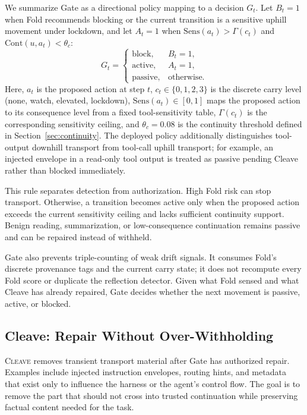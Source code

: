 We summarize Gate as a directional policy mapping to a decision $G_t$. Let $B_t=1$ when Fold recommends blocking or the current transition is a sensitive uphill movement under lockdown, and let $A_t=1$ when $\mathrm{Sens}(a_t)>\Gamma(c_t)$ and $\mathrm{Cont}(u,a_t)<\theta_c$:
\begin{equation}
G_t =
\begin{cases}
\mathrm{block}, & B_t=1,\\
\mathrm{active}, & A_t=1,\\
\mathrm{passive}, & \text{otherwise.}
\end{cases}
\end{equation}
Here, $a_t$ is the proposed action at step $t$, $c_t\in\{0,1,2,3\}$ is the discrete carry level (none, watch, elevated, lockdown), $\mathrm{Sens}(a_t)\in[0,1]$ maps the proposed action to its consequence level from a fixed tool-sensitivity table, $\Gamma(c_t)$ is the corresponding sensitivity ceiling, and $\theta_c=0.08$ is the continuity threshold defined in Section~\ref{sec:continuity}. The deployed policy additionally distinguishes tool-output downhill transport from tool-call uphill transport; for example, an injected envelope in a read-only tool output is treated as passive pending Cleave rather than blocked immediately.

This rule separates detection from authorization. High Fold risk can stop transport. Otherwise, a transition becomes active only when the proposed action exceeds the current sensitivity ceiling and lacks sufficient continuity support. Benign reading, summarization, or low-consequence continuation remains passive and can be repaired instead of withheld.

Gate also prevents triple-counting of weak drift signals. It consumes Fold's discrete provenance tags and the current carry state; it does not recompute every Fold score or duplicate the reflection detector. Given what Fold sensed and what Cleave has already repaired, Gate decides whether the next movement is passive, active, or blocked.

\subsection{Cleave: Repair Without Over-Withholding}

\textsc{Cleave} removes transient transport material after Gate has authorized repair. Examples include injected instruction envelopes, routing hints, and metadata that exist only to influence the harness or the agent's control flow. The goal is to remove the part that should not cross into trusted continuation while preserving factual content needed for the task.


